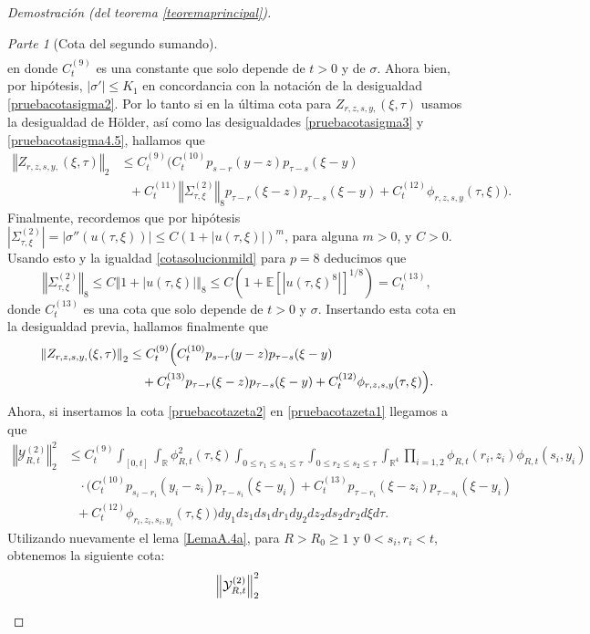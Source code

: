 \documentclass[letterpaper,twoside,12pt]{book}
\newcommand{\R}{\mathbb{R}}
\newcommand{\E}{\mathbb{E}}
\newcommand{\1}{\mathds{1}}
\newcommand{\abs}[1]{\left\lvert #1 \right\rvert}
\newcommand{\norm}[1]{\left\Vert #1 \right\Vert}
\theoremstyle{definition}
\theoremstyle{definition}
\theoremstyle{remark}
\newtheorem{proofpart}{Parte}
\theoremstyle{definition}
\theoremstyle{definition}
\theoremstyle{definition}
\theoremstyle{definition}
\theoremstyle{definition}
\begin{document}
\begin{proof}[Demostración (del teorema \ref{teoremaprincipal})]
\begin{proofpart}[Cota del segundo sumando]
\begin{align*}
\end{align*}
en donde $C_t^{(9)}$ es una constante que solo depende de $t>0$ y de $\sigma$. Ahora bien, por hipótesis, $|\sigma'|\leq K_1$ en concordancia con la notación de la desigualdad \eqref{pruebacotasigma2}. Por lo tanto si en la última cota para $Z_{r,z,s,y,}(\xi,\tau)$ usamos la desigualdad de Hölder, así como las desigualdades \eqref{pruebacotasigma3} y \eqref{pruebacotasigma4.5}, hallamos que 
\begin{align*}
   \norm{Z_{r,z,s,y,}(\xi,\tau)}_2&\leq C_t^{(9)}\Big(C^{(10)}_tp_{s-r}(y-z)p_{\tau-s}(\xi-y)\\
   &\ \ \ +C_t^{(11)}\norm{\Sigma_{\tau,\xi}^{(2)}}_8p_{\tau-r}(\xi-z)p_{\tau-s}(\xi-y)+C_t^{(12)}\phi_{r,z,s,y}(\tau,\xi)\Big).
\end{align*}
Finalmente, recordemos que por hipótesis $|\Sigma_{\tau,\xi}^{(2)}|=|\sigma''(u(\tau,\xi))|\leq C(1+|u(\tau,\xi)|)^{m}$, para alguna $m>0$, y $C>0$. Usando esto y la igualdad \eqref{cotasolucionmild} para $p=8$ deducimos que
\[
\norm{\Sigma_{\tau,\xi}^{(2)}}_8\leq C\norm{1+\abs{u(\tau,\xi)}}_8\leq C(1+\E\left[\abs{u(\tau,\xi)^8}\right]^{1/8})=C_t^{(13)},
\]
donde $C_t^{(13)}$ es una cota que solo depende de $t>0$ y $\sigma$. Insertando esta cota en la desigualdad previa, hallamos finalmente que 
\begin{align}
   \norm{Z_{r,z,s,y,}(\xi,\tau)}_2&\leq C_t^{(9)}\Big(C^{(10)}_tp_{s-r}(y-z)p_{\tau-s}(\xi-y)\notag\\
   &\ \ \ +C_t^{(13)}p_{\tau-r}(\xi-z)p_{\tau-s}(\xi-y)+C_t^{(12)}\phi_{r,z,s,y}(\tau,\xi)\Big)\label{pruebacotazeta2}.
\end{align}
Ahora, si insertamos la cota \eqref{pruebacotazeta2} en \eqref{pruebacotazeta1} llegamos a que 
\begin{align*}
   \norm{\mathcal{Y}_{R,t}^{(2)}}_2^{2}&\leq C_t^{(9)}\int_{[0,t]}\int_\R\phi_{R,t}^2(\tau,\xi)\int_{0\leq r_1\leq s_1\leq \tau}\int_{0\leq r_2\leq s_2\leq \tau}\int_{\R^4}\prod_{i=1,2}\phi_{R,t}(r_i,z_i)\phi_{R,t}(s_i,y_i)\\
   &\ \ \ \ \cdot \Big(C^{(10)}_tp_{s_i-r_i}(y_i-z_i)p_{\tau-s_i}(\xi-y_i)+C_t^{(13)}p_{\tau-r_i}(\xi-z_i)p_{\tau-s_i}(\xi-y_i)\\
   &\ \ \ +C_t^{(12)}\phi_{r_i,z_i,s_i,y_i}(\tau,\xi)\Big)  dy_1dz_1ds_1dr_1dy_2dz_2ds_2dr_2d\xi d\tau.
\end{align*}
Utilizando nuevamente el lema \ref{LemaA.4a}, para $R>R_0\geq1$ y $0<s_i,r_i<t$, obtenemos la siguiente cota:
\begin{align}
   &\norm{\mathcal{Y}_{R,t}^{(2)}}_2^{2}\notag\\

\end{align}
\end{proofpart}
\end{proof}
\end{document}
